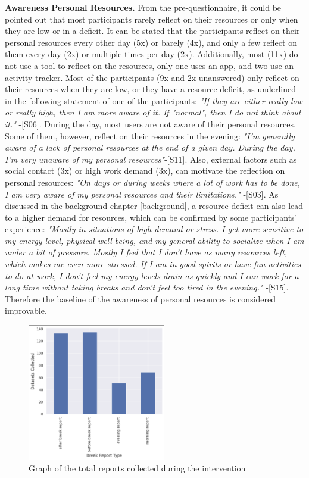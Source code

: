 \documentclass{hasel_thesis}
\begin{document}
\textbf{Awareness Personal Resources.} \label{awareness_resources}
From the pre-questionnaire, it could be pointed out that most participants rarely reflect on their resources or only when they are low or in a deficit.  It can be stated that the participants reflect on their personal resources every other day (5x) or barely (4x), and only a few reflect on them every day (2x) or multiple times per day (2x).  Additionally, most (11x) do not use a tool to reflect on the resources, only one uses an app, and two use an activity tracker.  Most of the participants (9x and 2x unanswered) only reflect on their resources when they are low, or they have a resource deficit, as underlined in the following statement of one of the participants: \textit{"If they are either really low or really high, then I am more aware of it.  If "normal", then I do not think about it."} -[S06]. During the day, most users are not aware of their personal resources.  Some of them, however, reflect on their resources in the evening: \textit{"I'm generally aware of a lack of personal resources at the end of a given day.  During the day, I'm very unaware of my personal resources"}-[S11].  Also, external factors such as social contact (3x) or high work demand (3x), can motivate the reflection on personal resources: \textit{"On days or during weeks where a lot of work has to be done, I am very aware of my personal resources and their limitations." } -[S03]. As discussed in the background chapter \ref{background}, a resource deficit can also lead to a higher demand for resources, which can be confirmed by some participants' experience: \textit{"Mostly in situations of high demand or stress.  I get more sensitive to my energy level, physical well-being, and my general ability to socialize when I am under a bit of pressure.  Mostly I feel that I don't have as many resources left, which makes me even more stressed.  If I am in good spirits or have fun activities to do at work, I don't feel my energy levels drain as quickly and I can work for a long time without taking breaks and don't feel too tired in the evening." }-[S15]. Therefore the baseline of the awareness of personal resources is considered improvable.

\begin{figure}[htp]
    \centering
    \includegraphics[width=6cm]{hasel_thesis/images/overall_reports.png}
    \caption{Graph of the total reports collected during the intervention}
    \label{fig:overall_reports}
\end{figure}
\end{document}
